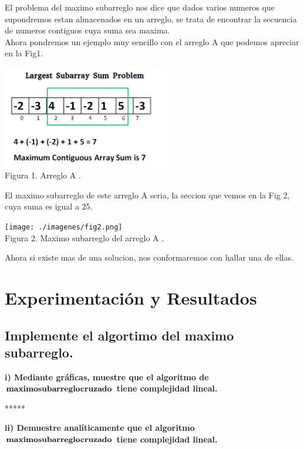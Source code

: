 \documentclass[spanish]{article}
\begin{document}
	El problema del maximo subarreglo nos dice que dados varios numeros que supondremos estan almacenados en un arreglo, se trata de encontrar la secuencia de numeros contiguos cuya suma sea maxima.\\
	Ahora pondremos un ejemplo muy sencillo con el arreglo A que podemos apreciar en la Fig1.\\
	\begin{center}
		\includegraphics[width=0.55\textwidth]{./imagenes/fig1.png}\\
		Figura 1. Arreglo A .\\
	\end{center}
	El maximo subarreglo de este arreglo A seria, la seccion que vemos en la Fig 2, cuya suma es igual a 25.\\
	\begin{center}
		\texttt{[image: ./imagenes/fig2.png]}\\
		Figura 2. Maximo subarreglo del arreglo A .\\
	\end{center}
	Ahora si existe mas de una solucion, nos conformaremos con hallar una de ellas.
	\newpage	

	\section{Experimentaci\'on y Resultados}
	
	\subsection{Implemente el algortimo del maximo subarreglo.}
	
	{\large{ {\bf i) Mediante gráficas, muestre que el algoritmo de  ${\bf maximo subarreglo cruzado}$ tiene complejidad lineal.}}}\\

	\bigskip

	*****

	\bigskip

	{\large{\bf ii)  Demuestre analíticamente que el algoritmo  ${\bf maximo subarreglo cruzado}$ tiene complejidad lineal.}}\\
	
\end{document}
